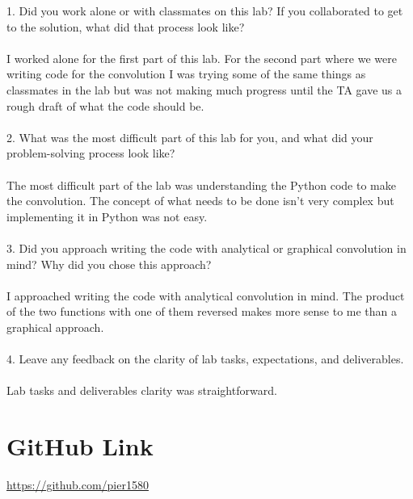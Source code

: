 1. Did you work alone or with classmates on this lab? If you collaborated to get to the solution, what did that process look like?
\\ \\
I worked alone for the first part of this lab.  For the second part where we were writing code for the convolution I was trying some of the same things as classmates in the lab but was not making much progress until the TA gave us a rough draft of what the code should be.
\\ \\ 
2. What was the most difficult part of this lab for you, and what did your problem-solving process look like?
\\ \\ 
The most difficult part of the lab was understanding the Python code to make the convolution.  The concept of what needs to be done isn't very complex but implementing it in Python was not easy.
\\ \\
3. Did you approach writing the code with analytical or graphical convolution in mind? Why did you chose this approach?
\\ \\
I approached writing the code with analytical convolution in mind.  The product of the two functions with one of them reversed makes more sense to me than a graphical approach.
\\ \\
4. Leave any feedback on the clarity of lab tasks, expectations, and deliverables.
\\ \\
Lab tasks and deliverables clarity was straightforward.  

\section{GitHub Link}
\url{https://github.com/pier1580}
